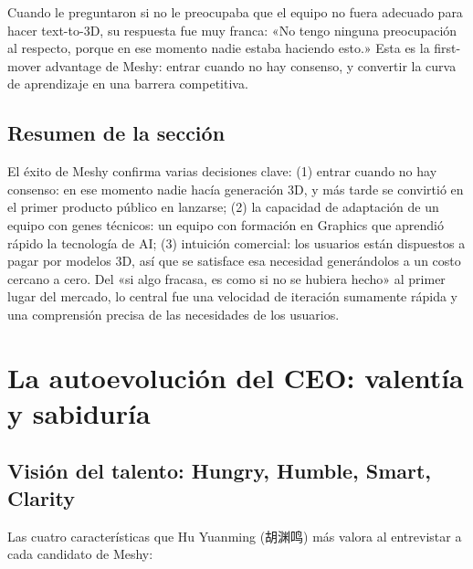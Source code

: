 \documentclass[a4paper]{article}
\begin{document}
Cuando le preguntaron si no le preocupaba que el equipo no fuera adecuado para hacer text-to-3D, su respuesta fue muy franca: «No tengo ninguna preocupación al respecto, porque en ese momento nadie estaba haciendo esto.» Esta es la first-mover advantage de Meshy: entrar cuando no hay consenso, y convertir la curva de aprendizaje en una barrera competitiva.

\subsection{Resumen de la sección}

El éxito de Meshy confirma varias decisiones clave: (1) entrar cuando no hay consenso: en ese momento nadie hacía generación 3D, y más tarde se convirtió en el primer producto público en lanzarse; (2) la capacidad de adaptación de un equipo con genes técnicos: un equipo con formación en Graphics que aprendió rápido la tecnología de AI; (3) intuición comercial: los usuarios están dispuestos a pagar por modelos 3D, así que se satisface esa necesidad generándolos a un costo cercano a cero. Del «si algo fracasa, es como si no se hubiera hecho» al primer lugar del mercado, lo central fue una velocidad de iteración sumamente rápida y una comprensión precisa de las necesidades de los usuarios.
\section{La autoevolución del CEO: valentía y sabiduría}

\subsection{Visión del talento: Hungry, Humble, Smart, Clarity}

Las cuatro características que Hu Yuanming (胡渊鸣) más valora al entrevistar a cada candidato de Meshy:
\end{document}
